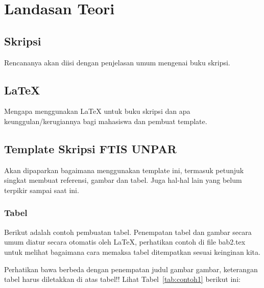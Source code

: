 \chapter{Landasan Teori}
\label{chap:teori}

\section{Skripsi}
\label{sec:skripsi} 
 
Rencananya akan diisi dengan penjelasan umum mengenai buku skripsi.


\section{\LaTeX}
\label{sec:latex}

Mengapa menggunakan \LaTeX{} untuk buku skripsi dan apa keunggulan/kerugiannya bagi mahasiswa dan pembuat template. 



\section{Template Skripsi FTIS UNPAR}
\label{sec:template}
 
Akan dipaparkan bagaimana menggunakan template ini, termasuk petunjuk singkat membuat referensi, gambar dan tabel.
Juga hal-hal lain yang belum terpikir sampai saat ini. 
 


\subsection{Tabel}  
Berikut adalah contoh pembuatan tabel. 
Penempatan tabel dan gambar secara umum diatur secara otomatis oleh \LaTeX{}, perhatikan contoh di file bab2.tex untuk melihat bagaimana cara memaksa tabel ditempatkan sesuai keinginan kita.

Perhatikan bawa berbeda dengan penempatan judul gambar gambar, keterangan tabel harus diletakkan di atas tabel!!
Lihat Tabel~\ref{tab:contoh1} berikut ini:

